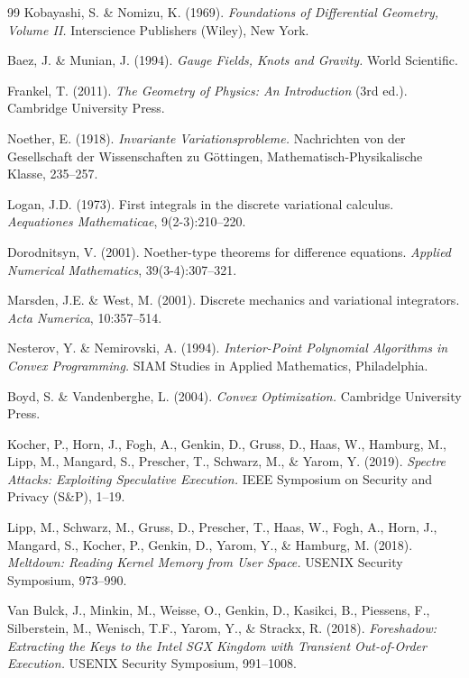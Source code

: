 \documentclass[11pt,letterpaper]{article}
\theoremstyle{definition}
\theoremstyle{remark}
\begin{document}
\begin{thebibliography}{99}
Kobayashi, S. \& Nomizu, K. (1969). \emph{Foundations of Differential Geometry, Volume II.} Interscience Publishers (Wiley), New York.

Baez, J. \& Munian, J. (1994). \emph{Gauge Fields, Knots and Gravity.} World Scientific.

Frankel, T. (2011). \emph{The Geometry of Physics: An Introduction} (3rd ed.). Cambridge University Press.

Noether, E. (1918). \emph{Invariante Variationsprobleme.} Nachrichten von der Gesellschaft der Wissenschaften zu G\"ottingen, Mathematisch-Physikalische Klasse, 235--257.

Logan, J.D. (1973). First integrals in the discrete variational calculus. \emph{Aequationes Mathematicae}, 9(2-3):210--220.

Dorodnitsyn, V. (2001). Noether-type theorems for difference equations. \emph{Applied Numerical Mathematics}, 39(3-4):307--321.

Marsden, J.E. \& West, M. (2001). Discrete mechanics and variational integrators. \emph{Acta Numerica}, 10:357--514.

Nesterov, Y. \& Nemirovski, A. (1994). \emph{Interior-Point Polynomial Algorithms in Convex Programming.} SIAM Studies in Applied Mathematics, Philadelphia.

Boyd, S. \& Vandenberghe, L. (2004). \emph{Convex Optimization.} Cambridge University Press.

Kocher, P., Horn, J., Fogh, A., Genkin, D., Gruss, D., Haas, W., Hamburg, M., Lipp, M., Mangard, S., Prescher, T., Schwarz, M., \& Yarom, Y. (2019). \emph{Spectre Attacks: Exploiting Speculative Execution.} IEEE Symposium on Security and Privacy (S\&P), 1--19.

Lipp, M., Schwarz, M., Gruss, D., Prescher, T., Haas, W., Fogh, A., Horn, J., Mangard, S., Kocher, P., Genkin, D., Yarom, Y., \& Hamburg, M. (2018). \emph{Meltdown: Reading Kernel Memory from User Space.} USENIX Security Symposium, 973--990.

Van Bulck, J., Minkin, M., Weisse, O., Genkin, D., Kasikci, B., Piessens, F., Silberstein, M., Wenisch, T.F., Yarom, Y., \& Strackx, R. (2018). \emph{Foreshadow: Extracting the Keys to the Intel SGX Kingdom with Transient Out-of-Order Execution.} USENIX Security Symposium, 991--1008.


\end{thebibliography}
\end{document}
